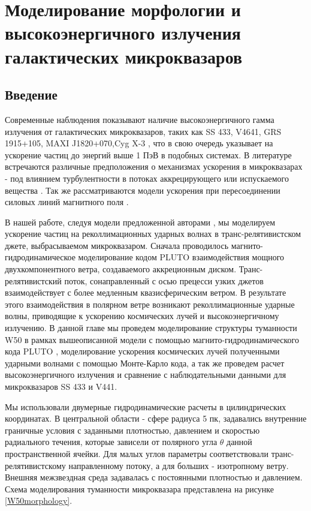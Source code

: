 \chapter{Моделирование морфологии и высокоэнергичного излучения галактических микроквазаров}\label{SS433chapter}

\FloatBarrier
\section{Введение}

Современные наблюдения показывают наличие высокоэнергичного гамма излучения от галактических микроквазаров, таких как SS 433, V4641, GRS 1915+105, MAXI J1820+070,Cyg X-3  \cite{LHAASO2024SS433, HESS2024SS433,V4641_HAWC_2024Natur.634..557A, V4641_HESS_2026A&A...706A...8A,LHAASO_MQs_2025NSRev..12af496L, CygX3_LHAASO25}, что в свою очередь указывает на ускорение частиц до энергий выше 1 ПэВ в подобных системах. В литературе встречаются различные предположения о механизмах ускорения в микроквазарах - под влиянием турбулентности в потоках аккрецирующего \cite{Kimura2019, Lemoine2025} или испускаемого вещества \cite{Dmitriev2026}. Так же рассматриваются модели ускорения при пересоединении силовых линий магнитного поля \cite{Pasquevich2026, Kleimenov2025}.

В нашей работе, следуя модели предложенной авторами \cite{Churazov2024}, мы моделируем ускорение частиц на реколлимационных ударных волнах в транс-релятивистском джете, выбрасываемом микроквазаром. Сначала проводилось магнито-гидродинамическое моделирование кодом PLUTO\cite{Mignone2007} взаимодействия мощного двухкомпонентного ветра, создаваемого аккреционным диском. Транс-релятивистский поток, сонаправленный с осью прецесси узких джетов взаимодействует с более медленным квазисферическим ветром. В результате этого взаимодействия в полярном ветре возникают реколлимационные ударные волны, приводящие к ускорению космических лучей и высокоэнергичному излучению. В данной главе мы проведем моделирование структуры туманности W50 в рамках вышеописанной модели с помощью магнито-гидродинамического кода PLUTO \cite{Mignone2007}, моделирование ускорения космических лучей полученными ударными волнами с помощью Монте-Карло кода, а так же проведем расчет высокоэнергичного излучения и сравнение с наблюдательными данными для микроквазаров SS 433 и V441.

Мы использовали двумерные гидродинамические расчеты в цилиндрических координатах. В центральной области - сфере радиуса 5 пк, задавались внутренние граничные условия с заданными плотностью, давлением и скоростью радиального течения, которые зависели от полярного угла $\theta$ данной пространственной ячейки. Для малых углов параметры соответствовали транс-релятивистскому направленному потоку, а для больших - изотропному ветру. Внешняя межзвездная среда задавалась с постоянными плотностью и давлением. Схема моделирования туманности микроквазара представлена на рисунке \ref{W50morphology}.


